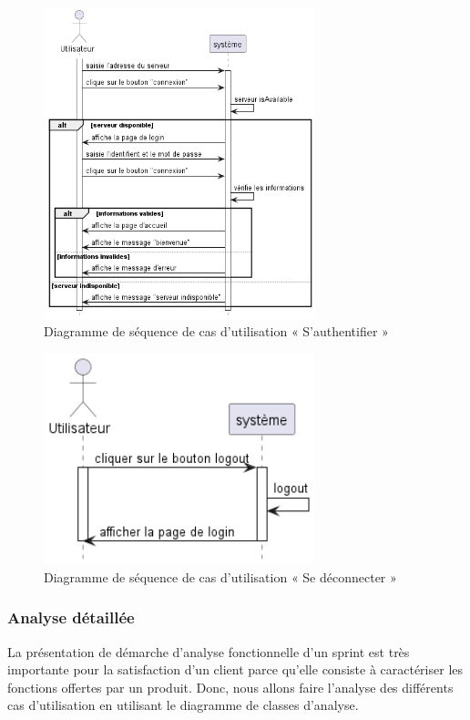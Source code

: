 \begin{figure}[H]
  \centering
  \includegraphics[width=0.7\textwidth]{out/diagrams/authentification/simple_login/simple_login}
  \caption{Diagramme de séquence de cas d'utilisation « S'authentifier »}
  \label{fig:sequence_login}
\end{figure}

\begin{figure}[H]
  \centering
  \includegraphics[width=0.7\textwidth]{out/diagrams/authentification/logout/logout}
  \caption{Diagramme de séquence de cas d'utilisation « Se déconnecter »}
  \label{fig:sequence_logout}
\end{figure}


\subsubsection{Analyse détaillée}
La présentation de démarche d'analyse fonctionnelle d'un sprint est très importante pour la satisfaction d'un client parce qu'elle consiste à caractériser les fonctions offertes par un produit.
Donc, nous allons faire l'analyse des différents cas d'utilisation en utilisant le diagramme de classes d'analyse.

